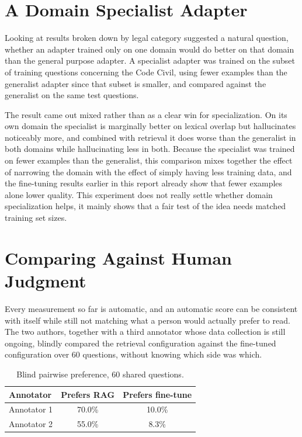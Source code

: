 \documentclass[11pt, a4paper]{article}
\begin{document}
\section{A Domain Specialist Adapter}

Looking at results broken down by legal category suggested a natural question, whether an adapter trained only on one domain would do better on that domain than the general purpose adapter. A specialist adapter was trained on the subset of training questions concerning the Code Civil, using fewer examples than the generalist adapter since that subset is smaller, and compared against the generalist on the same test questions.

The result came out mixed rather than as a clear win for specialization. On its own domain the specialist is marginally better on lexical overlap but hallucinates noticeably more, and combined with retrieval it does worse than the generalist in both domains while hallucinating less in both. Because the specialist was trained on fewer examples than the generalist, this comparison mixes together the effect of narrowing the domain with the effect of simply having less training data, and the fine-tuning results earlier in this report already show that fewer examples alone lower quality. This experiment does not really settle whether domain specialization helps, it mainly shows that a fair test of the idea needs matched training set sizes.

\section{Comparing Against Human Judgment}

Every measurement so far is automatic, and an automatic score can be consistent with itself while still not matching what a person would actually prefer to read. The two authors, together with a third annotator whose data collection is still ongoing, blindly compared the retrieval configuration against the fine-tuned configuration over 60 questions, without knowing which side was which.

\begin{table}[H]
\centering
\small
\begin{tabular}{lcc}
\toprule
\textbf{Annotator} & \textbf{Prefers RAG} & \textbf{Prefers fine-tune} \\
\midrule
Annotator 1 & 70.0\% & 10.0\% \\
Annotator 2 & 55.0\% & 8.3\% \\
\bottomrule
\end{tabular}
\caption{Blind pairwise preference, 60 shared questions.}
\label{tab:arena}
\end{table}
\end{document}
